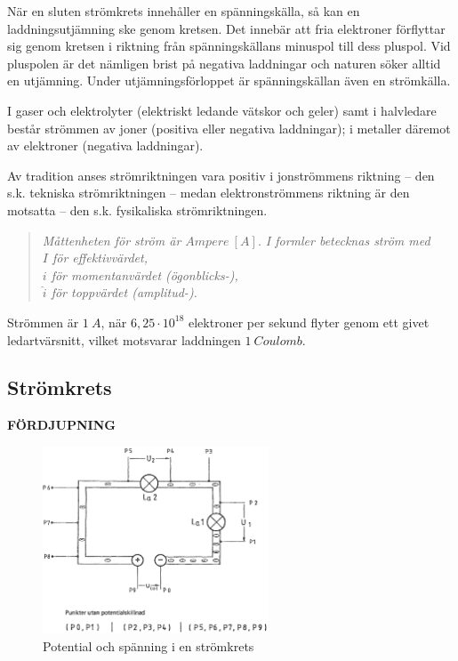 När en sluten strömkrets innehåller en spänningskälla, så kan en
laddningsutjämning ske genom kretsen. Det innebär att fria elektroner
förflyttar sig genom kretsen i riktning från spänningskällans minuspol till
dess pluspol. Vid pluspolen är det nämligen brist på negativa laddningar och
naturen söker alltid en utjämning. Under utjämningsförloppet är spänningskällan
även en strömkälla.

I gaser och elektrolyter (elektriskt ledande vätskor och geler) samt i
halvledare består strömmen av joner (positiva eller negativa laddningar);
i metaller däremot av elektroner (negativa laddningar).

Av tradition anses strömriktningen vara positiv i jonströmmens riktning -- den
s.k. tekniska strömriktningen -- medan elektronströmmens riktning är den
motsatta -- den s.k. fysikaliska strömriktningen.

\begin{quote}
\emph{Måttenheten för ström är \(Ampere\ [A]\).}
\emph{I formler betecknas ström med} \\
\emph{\(I\) för effektivvärdet,} \\
\emph{\(i\) för momentanvärdet (ögonblicks-),} \\
\emph{\(\hat{i}\) för toppvärdet (amplitud-).}
\end{quote}

Strömmen är \(1\ A\), när \(6,25 \cdot 10^{18}\) elektroner per sekund flyter genom ett givet
ledartvärsnitt, vilket motsvarar laddningen \(1\ Coulomb\).

\subsection{Strömkrets}
\textbf{FÖRDJUPNING}

\begin{figure}
\begin{center}
\includegraphics[width=0.6\textwidth]{images/cropped_pdfs/bild_2_1-03.pdf}
\caption{Potential och spänning i en strömkrets}
\label{fig:BildII1-3}
\end{center}
\end{figure}

